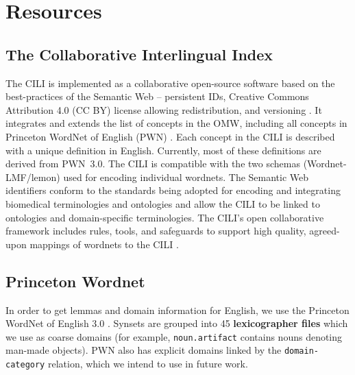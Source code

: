 \documentclass[11pt]{article}
\begin{document}
\section{Resources}

\subsection{The Collaborative Interlingual Index}
The CILI is implemented as a collaborative open-source software based on the best-practices of the Semantic Web -- persistent IDs, Creative Commons Attribution 4.0 (CC BY) license allowing redistribution, and versioning \citep{Bond:2016a}. It integrates and extends the list of concepts in the OMW, including all concepts in Princeton WordNet of English (PWN) \citep{Fellbaum:1998a}. Each concept in the CILI is described with a unique definition in English. Currently, most of these definitions are derived from PWN~3.0. The CILI is compatible with the two schemas (Wordnet-LMF/lemon) \citep{vossen2016toward,mccrae2014publishing}
used for encoding individual wordnets. The Semantic Web identifiers conform to the standards being adopted for encoding and integrating biomedical terminologies and ontologies \citep{ruttenberg2007advancing,schuurman2008ontologies} and allow the CILI to be linked to ontologies and domain-specific terminologies.  The CILI's open collaborative framework includes rules, tools, and safeguards to support high quality, agreed-upon mappings of wordnets to the CILI \citep{Bond:2016a}.

\subsection{Princeton Wordnet}

In order to get lemmas and domain information for English, we use the Princeton WordNet of English 3.0 \citep{Fellbaum:1998a}. Synsets are grouped into 45 \textbf{lexicographer files} which we use as coarse domains (for example, \texttt{noun.artifact} contains   nouns denoting man-made objects).  PWN also has explicit domains linked by the \texttt{domain-category} relation, which we intend to use in future work.
\end{document}
